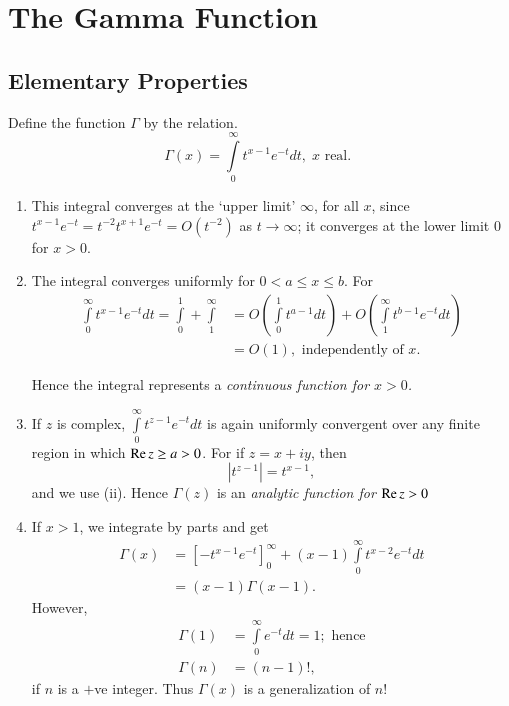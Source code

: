 \chapter{The Gamma Function}\label{chap6}

\section[Elementary Properties]{Elementary Properties \protect \cite[p.148]{key15}}\label{chap6:sec1}\pageoriginale 

Define the function $\Gamma$ by the relation.
$$
\Gamma (x) = \int\limits^\infty_0 t^{x-1} e^{-t} dt, \; x \text{ real. }
$$
\begin{enumerate}
\renewcommand{\theenumi}{\roman{enumi}}
\renewcommand{\labelenumi}{(\theenumi)}
\item This integral converges at the `upper limit' $\infty$, for all
  $x$, since $t^{x-1} e^{-t} = t^{-2} t^{x+1} e^{-t} = O(t^{-2})$ as
  $t \to \infty$; it converges at the lower limit $0$ for $x>0$.

\item The integral converges uniformly for $0<a \leq x \leq b$. For 
\begin{align*}
\int\limits^\infty_0 t^{x-1} e^{-t} dt = \int\limits^1_0 +
\int\limits^\infty_1 & = O \left( \int\limits^1_0 t^{a-1} dt\right) +
O \left( \int\limits^{\infty}_1 t^{b-1} e^{-t} dt\right)\\
& = O (1), \text{ independently of $x$.}
\end{align*}

Hence the integral represents a \textit{continuous function for $x>0$.}

\item If $z$ is complex, $\int\limits^\infty_0 t^{z-1} e^{-t} dt$ is
  again uniformly convergent over any finite region in which $\operatorname{Re} z
  \geq a > 0$. For if $z = x + iy$, then 
$$
|t^{z-1}| = t^{x-1},
$$
and we use (ii). Hence $\Gamma (z)$ is an \textit{analytic function
  for $\operatorname{Re} z >0$}

\item If $x>1$, we integrate by parts and get
\begin{align*}
\Gamma (x) & = \left[ -t^{x-1} e^{-t}\right]^{\infty}_0 + (x-1)
\int\limits^{\infty}_0 t^{x-2} e^{-t} dt\\
& = (x-1) \Gamma (x-1).
\end{align*}
However,\pageoriginale  
\begin{align*}
\Gamma (1) & = \int\limits^\infty_0 e^{-t} dt = 1; \text{ hence}\\
\Gamma (n) & = (n-1) !,
\end{align*}
if $n$ is a $+$ve integer. Thus $\Gamma (x)$ is a generalization of $n!$


\end{enumerate}
